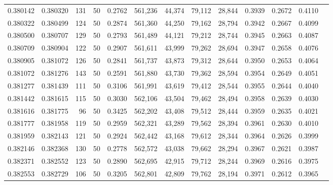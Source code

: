\begin{tabular}{rrrrrrrrrrrrr}
0.380142 & 0.380320 &   131 &  50 &                                     0.2762 & 561,236 &  44,374 &  79,112 &  28,844 & 0.3939 & 0.2672 & 0.4110 \\
0.380322 & 0.380499 &   124 &  50 &                                     0.2874 & 561,360 &  44,250 &  79,162 &  28,794 & 0.3942 & 0.2667 & 0.4099 \\
0.380500 & 0.380707 &   129 &  50 &                                     0.2793 & 561,489 &  44,121 &  79,212 &  28,744 & 0.3945 & 0.2663 & 0.4087 \\
0.380709 & 0.380904 &   122 &  50 &                                     0.2907 & 561,611 &  43,999 &  79,262 &  28,694 & 0.3947 & 0.2658 & 0.4076 \\
0.380905 & 0.381072 &   126 &  50 &                                     0.2841 & 561,737 &  43,873 &  79,312 &  28,644 & 0.3950 & 0.2653 & 0.4064 \\
0.381072 & 0.381276 &   143 &  50 &                                     0.2591 & 561,880 &  43,730 &  79,362 &  28,594 & 0.3954 & 0.2649 & 0.4051 \\
0.381277 & 0.381439 &   111 &  50 &                                     0.3106 & 561,991 &  43,619 &  79,412 &  28,544 & 0.3955 & 0.2644 & 0.4040 \\
0.381442 & 0.381615 &   115 &  50 &                                     0.3030 & 562,106 &  43,504 &  79,462 &  28,494 & 0.3958 & 0.2639 & 0.4030 \\
0.381616 & 0.381775 &    96 &  50 &                                     0.3425 & 562,202 &  43,408 &  79,512 &  28,444 & 0.3959 & 0.2635 & 0.4021 \\
0.381777 & 0.381958 &   119 &  50 &                                     0.2959 & 562,321 &  43,289 &  79,562 &  28,394 & 0.3961 & 0.2630 & 0.4010 \\
0.381959 & 0.382143 &   121 &  50 &                                     0.2924 & 562,442 &  43,168 &  79,612 &  28,344 & 0.3964 & 0.2626 & 0.3999 \\
0.382146 & 0.382368 &   130 &  50 &                                     0.2778 & 562,572 &  43,038 &  79,662 &  28,294 & 0.3967 & 0.2621 & 0.3987 \\
0.382371 & 0.382552 &   123 &  50 &                                     0.2890 & 562,695 &  42,915 &  79,712 &  28,244 & 0.3969 & 0.2616 & 0.3975 \\
0.382553 & 0.382729 &   106 &  50 &                                     0.3205 & 562,801 &  42,809 &  79,762 &  28,194 & 0.3971 & 0.2612 & 0.3965 \\

\end{tabular}
